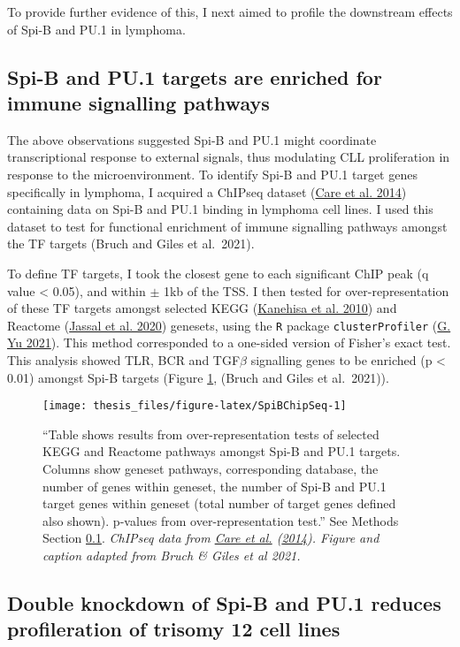 \documentclass[11pt, a4paper, twosided]{book}
\begin{document}
To provide further evidence of this, I next aimed to profile the downstream effects of Spi-B and PU.1 in lymphoma.

\hypertarget{spib-chip}{%
\subsection{Spi-B and PU.1 targets are enriched for immune signalling pathways}\label{spib-chip}}

The above observations suggested Spi-B and PU.1 might coordinate transcriptional response to external signals, thus modulating CLL proliferation in response to the microenvironment. To identify Spi-B and PU.1 target genes specifically in lymphoma, I acquired a ChIPseq dataset (\protect\hyperlink{ref-Care2014}{Care et al. 2014}) containing data on Spi-B and PU.1 binding in lymphoma cell lines. I used this dataset to test for functional enrichment of immune signalling pathways amongst the TF targets (Bruch and Giles et al.~2021).

To define TF targets, I took the closest gene to each significant ChIP peak (q value \textless{} 0.05), and within \(\pm\) 1kb of the TSS. I then tested for over-representation of these TF targets amongst selected KEGG (\protect\hyperlink{ref-KEGG}{Kanehisa et al. 2010}) and Reactome (\protect\hyperlink{ref-Reactome}{Jassal et al. 2020}) genesets, using the \texttt{R} package \texttt{clusterProfiler} (\protect\hyperlink{ref-R-clusterProfiler}{G. Yu 2021}). This method corresponded to a one-sided version of Fisher's exact test. This analysis showed TLR, BCR and TGF\(\beta\) signalling genes to be enriched (p \textless{} 0.01) amongst Spi-B targets (Figure \ref{fig:SpiBChipSeq}, (Bruch and Giles et al.~2021)).


\begin{figure}

{\centering \texttt{[image: thesis\_files/figure-latex/SpiBChipSeq-1]} 

}

\caption{``Table shows results from over-representation tests of selected KEGG and Reactome pathways amongst Spi-B and PU.1 targets. Columns show geneset pathways, corresponding database, the number of genes within geneset, the number of Spi-B and PU.1 target genes within geneset (total number of target genes defined also shown). p-values from over-representation test.'' See Methods Section \ref{spib-chip}. \emph{ChIPseq data from \protect\hyperlink{ref-Care2014}{Care et al.} (\protect\hyperlink{ref-Care2014}{2014}). Figure and caption adapted from Bruch \& Giles et al 2021.}}\label{fig:SpiBChipSeq}
\end{figure}
\hypertarget{shRNA-KDs}{%
\subsection{Double knockdown of Spi-B and PU.1 reduces profileration of trisomy 12 cell lines}\label{shRNA-KDs}}
\end{document}
